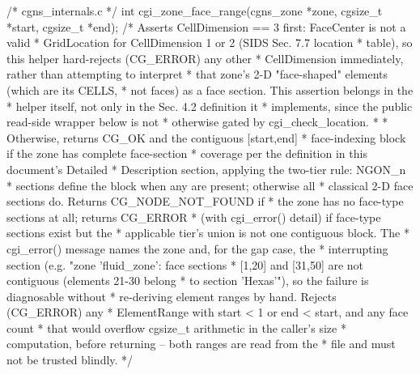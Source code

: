 \documentclass[11pt,letterpaper]{article}
\makeatletter
\let\cgns@orig@lstlisting\lstlisting
\let\cgns@endorig@lstlisting\endlstlisting
\renewenvironment{lstlisting}
  {\par\needspace{5\baselineskip}\nolinenumbers\cgns@orig@lstlisting}
  {\cgns@endorig@lstlisting\par\linenumbers}
\makeatother
\begin{document}
\begin{lstlisting}[language=C]
/* cgns_internals.c */
int cgi_zone_face_range(cgns_zone *zone,
                        cgsize_t *start, cgsize_t *end);
    /* Asserts CellDimension == 3 first: FaceCenter is not a valid
     * GridLocation for CellDimension 1 or 2 (SIDS Sec. 7.7 location
     * table), so this helper hard-rejects (CG_ERROR) any other
     * CellDimension immediately, rather than attempting to interpret
     * that zone's 2-D "face-shaped" elements (which are its CELLS,
     * not faces) as a face section. This assertion belongs in the
     * helper itself, not only in the Sec. 4.2 definition it
     * implements, since the public read-side wrapper below is not
     * otherwise gated by cgi_check_location.
     *
     * Otherwise, returns CG_OK and the contiguous [start,end]
     * face-indexing block if the zone has complete face-section
     * coverage per the definition in this document's Detailed
     * Description section, applying the two-tier rule: NGON_n
     * sections define the block when any are present; otherwise all
     * classical 2-D face sections do. Returns CG_NODE_NOT_FOUND if
     * the zone has no face-type sections at all; returns CG_ERROR
     * (with cgi_error() detail) if face-type sections exist but the
     * applicable tier's union is not one contiguous block. The
     * cgi_error() message names the zone and, for the gap case, the
     * interrupting section (e.g. "zone 'fluid_zone': face sections
     * [1,20] and [31,50] are not contiguous (elements 21-30 belong
     * to section 'Hexas'"), so the failure is diagnosable without
     * re-deriving element ranges by hand. Rejects (CG_ERROR) any
     * ElementRange with start < 1 or end < start, and any face count
     * that would overflow cgsize_t arithmetic in the caller's size
     * computation, before returning -- both ranges are read from the
     * file and must not be trusted blindly. */
\end{lstlisting}

\end{document}
